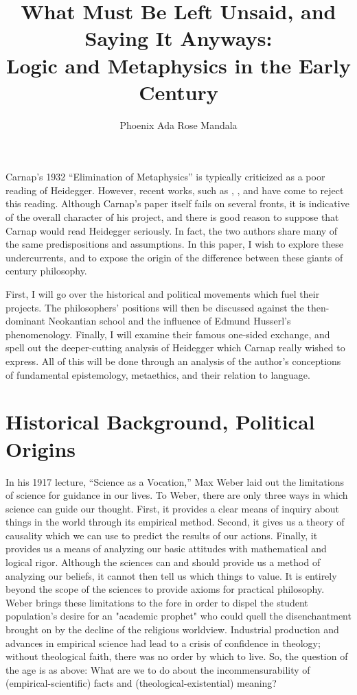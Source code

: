 \documentclass[leqno, 12pt]{turabian-researchpaper}
\title{What Must Be Left Unsaid, and Saying It Anyways: \\ Logic and Metaphysics
in the Early \nth{20} Century}
\author{Phoenix Ada Rose Mandala}
\begin{document}
	\maketitle

	Carnap's 1932 \enquote{Elimination of Metaphysics} \nocite{carnap1966} is
	typically criticized as a poor reading of Heidegger. However, recent works, such
	as \autocite{stone2017}, \autocite{priest2002a}, and \autocite{dambock2022}
	have come to reject this reading. Although Carnap's paper itself fails on several
	fronts, it is indicative of the overall character of his project, and there is
	good reason to suppose that Carnap would read Heidegger seriously. In fact, the
	two authors share many of the same predispositions and assumptions. In this
	paper, I wish to explore these undercurrents, and to expose the origin of the
	difference between these giants of  century philosophy.

	First, I will go over the historical and political movements which fuel their
	projects. The philosophers' positions will then be discussed against the then-dominant
	Neokantian school and the influence of Edmund Husserl's phenomenology. Finally,
	I will examine their famous one-sided exchange, and spell out the deeper-cutting
	analysis of Heidegger which Carnap really wished to express. All of this will
	be done through an analysis of the author's conceptions of fundamental
	epistemology, metaethics, and their relation to language.

	\section{Historical Background, Political Origins}

	In his 1917 lecture, \enquote{Science as a Vocation,} Max Weber laid out the limitations
	of science for guidance in our lives. To Weber, there are only three ways in which
	science can guide our thought. First, it provides a clear means of inquiry about
	things in the world through its empirical method. Second, it gives us a theory
	of causality which we can use to predict the results of our actions. Finally, it
	provides us a means of analyzing our basic attitudes with mathematical and logical
	rigor. Although the sciences can and should provide us a method of analyzing
	our beliefs, it cannot then tell us which things to value. It is entirely
	beyond the scope of the sciences to provide axioms for practical philosophy. Weber
	brings these limitations to the fore in order to dispel the student population's
	desire for an "academic prophet" who could quell the disenchantment brought on
	by the decline of the religious worldview. Industrial production and advances
	in empirical science had lead to a crisis of confidence in theology; without theological
	faith, there was no order by which to live. So, the question of the age is as
	above: What are we to do about the incommensurability of (empirical-scientific)
	facts and (theological-existential) meaning?
\end{document}
